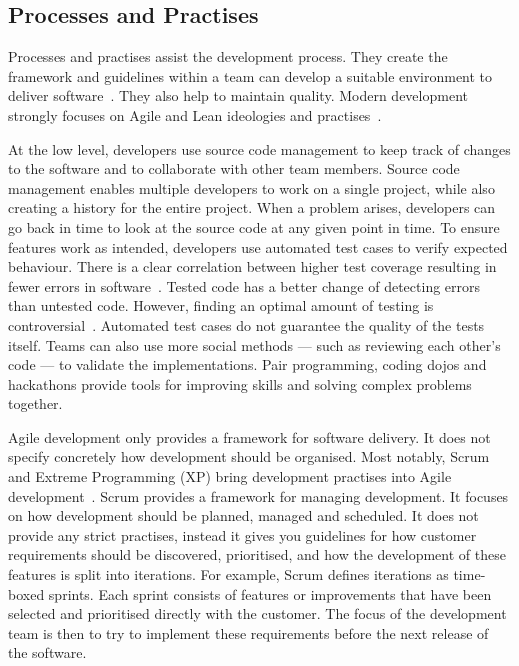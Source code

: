 \documentclass[english]{tktltiki2}
\begin{document}
\subsection{Processes and Practises}

Processes and practises assist the development process. They create the framework and guidelines within a team can develop a suitable environment to deliver software~\cite{Kni07}. They also help to maintain quality. Modern development strongly focuses on Agile and Lean ideologies and practises~\cite{BBB01a, Fow05, Mon12}.

At the low level, developers use source code management to keep track of changes to the software and to collaborate with other team members. Source code management enables multiple developers to work on a single project, while also creating a history for the entire project. When a problem arises, developers can go back in time to look at the source code at any given point in time. To ensure features work as intended, developers use automated test cases to verify expected behaviour. There is a clear correlation between higher test coverage resulting in fewer errors in software~\cite{MND09}. Tested code has a better change of detecting errors than untested code. However, finding an optimal amount of testing is controversial~\cite{MND09}. Automated test cases do not guarantee the quality of the tests itself. Teams can also use more social methods — such as reviewing each other’s code — to validate the implementations. Pair programming, coding dojos and hackathons provide tools for improving skills and solving complex problems together.

Agile development only provides a framework for software delivery. It does not specify concretely how development should be organised. Most notably, Scrum and Extreme Programming (XP) bring development practises into Agile development~\cite{LB03, SS10}. Scrum provides a framework for managing development. It focuses on how development should be planned, managed and scheduled. It does not provide any strict practises, instead it gives you guidelines for how customer requirements should be discovered, prioritised, and how the development of these features is split into iterations. For example, Scrum defines iterations as time-boxed sprints. Each sprint consists of features or improvements that have been selected and prioritised directly with the customer. The focus of the development team is then to try to implement these requirements before the next release of the software.
\end{document}

